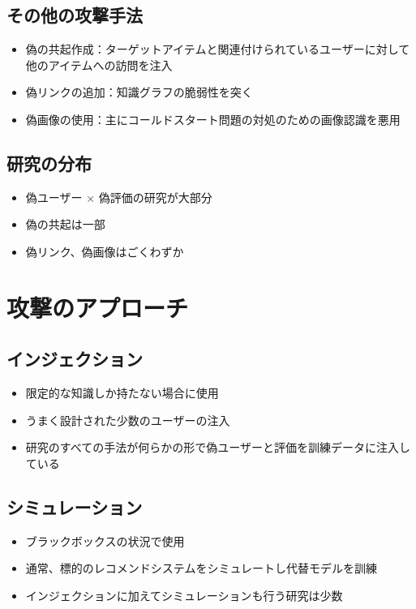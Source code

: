 \documentclass[11pt,a4paper]{article}
\begin{document}
\subsection{その他の攻撃手法}
\begin{itemize}
    \item 偽の共起作成：ターゲットアイテムと関連付けられているユーザーに対して他のアイテムへの訪問を注入
    \item 偽リンクの追加：知識グラフの脆弱性を突く
    \item 偽画像の使用：主にコールドスタート問題の対処のための画像認識を悪用
\end{itemize}

\subsection{研究の分布}
\begin{itemize}
    \item 偽ユーザー × 偽評価の研究が大部分
    \item 偽の共起は一部
    \item 偽リンク、偽画像はごくわずか
\end{itemize}

\section{攻撃のアプローチ}

\subsection{インジェクション}
\begin{itemize}
    \item 限定的な知識しか持たない場合に使用
    \item うまく設計された少数のユーザーの注入
    \item 研究のすべての手法が何らかの形で偽ユーザーと評価を訓練データに注入している
\end{itemize}

\subsection{シミュレーション}
\begin{itemize}
    \item ブラックボックスの状況で使用
    \item 通常、標的のレコメンドシステムをシミュレートし代替モデルを訓練
    \item インジェクションに加えてシミュレーションも行う研究は少数
\end{itemize}
\end{document}
